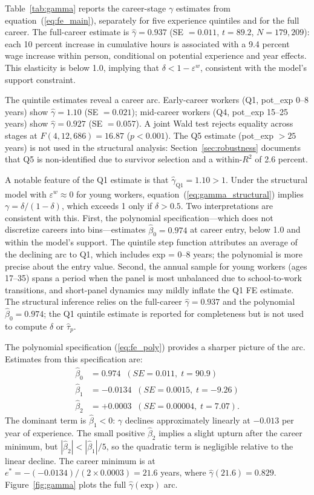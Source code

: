 \documentclass[12pt]{article}
\theoremstyle{definition}
\theoremstyle{remark}
\begin{document}
Table~\ref{tab:gamma} reports the career-stage $\gamma$ estimates from equation~(\ref{eq:fe_main}),
separately for five experience quintiles and for the full career. The full-career estimate is
$\hat{\gamma} = 0.937$ (SE $= 0.011$, $t = 89.2$, $N = 179{,}209$): each 10 percent increase
in cumulative hours is associated with a 9.4 percent wage increase within person, conditional
on potential experience and year effects. This elasticity is below 1.0, implying that $\delta <
1 - \varepsilon^w$, consistent with the model's support constraint.

The quintile estimates reveal a career arc. Early-career workers (Q1, pot\_exp 0--8 years)
show $\hat{\gamma} = 1.10$ (SE $= 0.021$); mid-career workers (Q4, pot\_exp 15--25 years)
show $\hat{\gamma} = 0.927$ (SE $= 0.057$). A joint Wald test rejects equality across stages
at $F(4, 12{,}686) = 16.87$ ($p < 0.001$). The Q5 estimate (pot\_exp $> 25$ years) is not
used in the structural analysis: Section~\ref{sec:robustness} documents that Q5 is
non-identified due to survivor selection and a within-$R^2$ of 2.6 percent.

A notable feature of the Q1 estimate is that $\hat{\gamma}_{\text{Q1}} = 1.10 > 1$. Under
the structural model with $\varepsilon^w \approx 0$ for young workers, equation~(\ref{eq:gamma_structural})
implies $\gamma = \delta / (1 - \delta)$, which exceeds 1 only if $\delta > 0.5$. Two
interpretations are consistent with this. First, the polynomial specification---which does not
discretize careers into bins---estimates $\hat{\beta}_0 = 0.974$ at career entry, below 1.0
and within the model's support. The quintile step function attributes an average of the
declining arc to Q1, which includes exp = 0--8 years; the polynomial is more precise about
the entry value. Second, the annual sample for young workers (ages 17--35) spans a period
when the panel is most unbalanced due to school-to-work transitions, and short-panel dynamics
may mildly inflate the Q1 FE estimate. The structural inference relies on the full-career
$\hat{\gamma} = 0.937$ and the polynomial $\hat{\beta}_0 = 0.974$; the Q1 quintile estimate
is reported for completeness but is not used to compute $\hat{\delta}$ or $\hat{\tau}_p$.

The polynomial specification (\ref{eq:fe_poly}) provides a sharper picture of the arc.
Estimates from this specification are:
\begin{align*}
\hat{\beta}_0 &= 0.974 \;\; (SE = 0.011,\; t = 90.9) \\
\hat{\beta}_1 &= -0.0134 \;\; (SE = 0.0015,\; t = -9.26) \\
\hat{\beta}_2 &= +0.0003 \;\; (SE = 0.00004,\; t = 7.07).
\end{align*}
The dominant term is $\hat{\beta}_1 < 0$: $\gamma$ declines approximately linearly at
$-0.013$ per year of experience. The small positive $\hat{\beta}_2$ implies a slight upturn
after the career minimum, but $|\hat{\beta}_2| < |\hat{\beta}_1|/5$, so the quadratic term
is negligible relative to the linear decline. The career minimum is at $e^* = -(-0.0134) /
(2 \times 0.0003) = 21.6$ years, where $\hat{\gamma}(21.6) = 0.829$. Figure~\ref{fig:gamma}
plots the full $\hat{\gamma}(\text{exp})$ arc.
\end{document}
